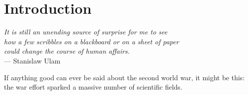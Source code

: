 \chapter{Introduction}
\bigskip

\begin{flushright}{\slshape
	It is still an unending source of surprise for me to see \\
	how a few scribbles on a blackboard or on a sheet of paper\\
	could change the course of human affairs.} \\ \medskip
    --- Stanislaw Ulam
\end{flushright}


\noindent If anything good can ever be said about the second world war, it might be this: the war effort sparked a massive number of scientific fields.

